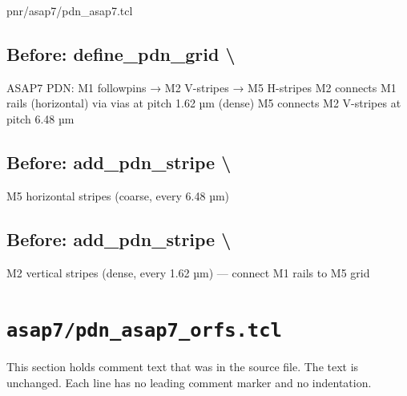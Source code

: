\begin{relocated}{pnr/asap7/pdn_asap7.tcl}

\subsection*{Before: define\_pdn\_grid \textbackslash{}}

\begin{textblock}
ASAP7 PDN: M1 followpins → M2 V-stripes → M5 H-stripes
M2 connects M1 rails (horizontal) via vias at pitch 1.62 µm (dense)
M5 connects M2 V-stripes at pitch 6.48 µm
\end{textblock}

\subsection*{Before: add\_pdn\_stripe \textbackslash{}}

\begin{textblock}
M5 horizontal stripes (coarse, every 6.48 µm)
\end{textblock}

\subsection*{Before: add\_pdn\_stripe \textbackslash{}}

\begin{textblock}
M2 vertical stripes (dense, every 1.62 µm) — connect M1 rails to M5 grid
\end{textblock}

\end{relocated}

\section{\texttt{asap7/pdn\_asap7\_orfs.tcl}}\label{tm:pd:asap7-pdn-orfs-tcl}

This section holds comment text that was in the source file. The text is unchanged. Each line has no leading comment marker and no indentation.

